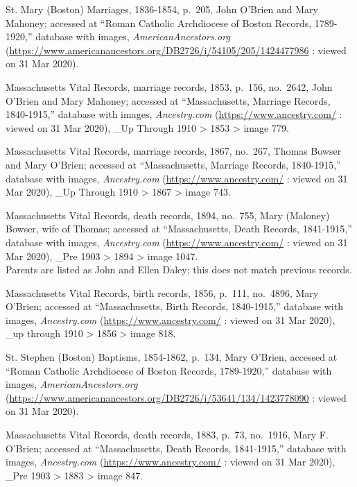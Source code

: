 \begin{thebibliography}{999}
	St. Mary (Boston) Marriages, 1836-1854, p.\ 205, John O'Brien and Mary Mahoney; accessed at ``Roman Catholic Archdiocese of Boston Records, 1789-1920,'' database with images, \textit{AmericanAncestors.org} (\url{https://www.americanancestors.org/DB2726/i/54105/205/1424477986} : viewed on 31 Mar 2020).
	
	Massachusetts Vital Records, marriage records, 1853, p.\ 156, no.\ 2642, John O'Brien and Mary Mahoney; accessed at ``Massachusetts, Marriage Records, 1840-1915,'' database with images, \textit{Ancestry.com} (\url{https://www.ancestry.com/} : viewed on 31 Mar 2020), \_Up Through 1910 > 1853 > image 779.
	
	Massachusetts Vital Records, marriage records, 1867, no.\ 267, Thomas Bowser and Mary O'Brien; accessed at ``Massachusetts, Marriage Records, 1840-1915,'' database with images, \textit{Ancestry.com} (\url{https://www.ancestry.com/} : viewed on 31 Mar 2020), \_Up Through 1910 > 1867 > image 743.
	
	Massachusetts Vital Records, death records, 1894, no.\ 755, Mary (Maloney) Bowser, wife of Thomas; accessed at ``Massachusetts, Death Records, 1841-1915,'' database with images, \textit{Ancestry.com} (\url{https://www.ancestry.com/} : viewed on 31 Mar 2020), \_Pre 1903 > 1894 > image 1047.\\
	Parents are listed as John and Ellen Daley; this does not match previous records.
	
	Massachusetts Vital Records, birth records, 1856, p.\ 111, no.\ 4896, Mary O'Brien; accessed at ``Massachusetts, Birth Records, 1840-1915,'' database with images, \textit{Ancestry.com} (\url{https://www.ancestry.com/} : viewed on 31 Mar 2020), \_up through 1910 > 1856 > image 818.
	
	St. Stephen (Boston) Baptisms, 1854-1862, p.\ 134, Mary O'Brien, accessed at ``Roman Catholic Archdiocese of Boston Records, 1789-1920,'' database with images, \textit{AmericanAncestors.org} (\url{https://www.americanancestors.org/DB2726/i/53641/134/1423778090} : viewed on 31 Mar 2020).
	
	Massachusetts Vital Records, death records, 1883, p.\ 73, no.\ 1916, Mary F. O'Brien; accessed at ``Massachusetts, Death Records, 1841-1915,'' database with images, \textit{Ancestry.com} (\url{https://www.ancestry.com/} : viewed on 31 Mar 2020), \_Pre 1903 > 1883 > image 847.
	

\end{thebibliography}
